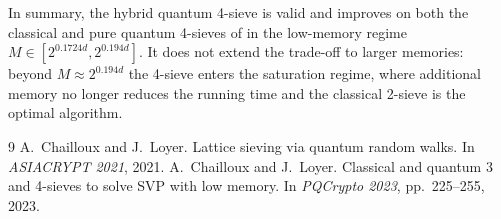 \documentclass[10pt,a4paper]{article}
\begin{document}
In summary, the hybrid quantum 4-sieve is valid and improves on both
the classical and pure quantum 4-sieves of \cite{CL23} in the low-memory
regime \(M \in [2^{0.1724d}, 2^{0.194d}]\). It does not extend the
trade-off to larger memories: beyond \(M \approx 2^{0.194d}\) the
4-sieve enters the saturation regime, where additional memory no longer
reduces the running time and the classical 2-sieve is the optimal
algorithm.

\begin{thebibliography}{9}
 A.~Chailloux and J.~Loyer. Lattice sieving via quantum random walks. In \emph{ASIACRYPT 2021}, 2021.
 A.~Chailloux and J.~Loyer. Classical and quantum 3 and 4-sieves to solve SVP with low memory. In \emph{PQCrypto 2023}, pp.~225--255, 2023.
\end{thebibliography}
\end{document}
